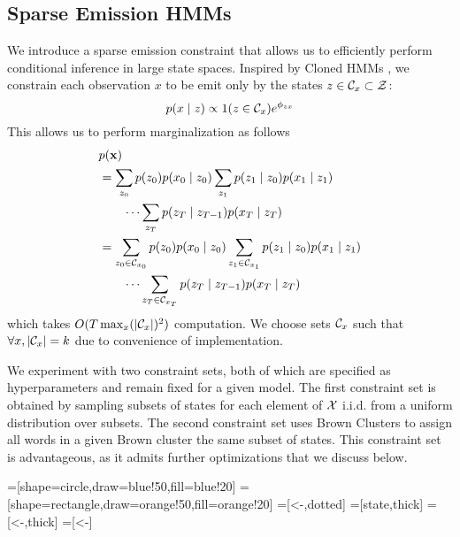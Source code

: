 \documentclass[11pt,a4paper]{article}
\begin{document}
\subsection{Sparse Emission HMMs}
We introduce a sparse emission constraint that allows us to
efficiently perform conditional inference in large state spaces.
Inspired by Cloned HMMs \citep{dedieu2019learning},
we constrain each observation $x$ to be emit only by the states $z \in \mathcal{C}_x \subset \mathcal{Z}$:
\begin{equation}
\label{eqn:sparse_emission}
p(x \mid z) \propto 1(z \in \mathcal{C}_x)e^{\phi_{zx}}
\end{equation}
This allows us to perform marginalization as follows
\begin{equation}
\label{eqn:sparse_marginalization}
\begin{aligned}
&p(\mathbf{x})\\
&= \sum_{z_0} p(z_0)p(x_0 \mid z_0)
    \sum_{z_1}p(z_1\mid z_0)p(x_1 \mid z_1)\\
    &\qquad\cdots
    \sum_{z_T}p(z_T \mid z_{T-1})p(x_T \mid z_T)\\
&= \sum_{z_0 \in \mathcal{C}_{x_0}} p(z_0)p(x_0 \mid z_0)
    \sum_{z_1 \in \mathcal{C}_{x_1}} p(z_1\mid z_0)p(x_1 \mid z_1)\\
    &\qquad\cdots
    \sum_{z_T \in \mathcal{C}_{x_T}} p(z_T \mid z_{T-1})p(x_T \mid z_T)
\end{aligned}
\end{equation}
which takes $O(T \max_x(|\mathcal{C}_x|)^2)$ computation.
We choose sets $\mathcal{C}_x$ such that $\forall x, |\mathcal{C}_x| = k$
due to convenience of implementation.

We experiment with two constraint sets, both of which are specified 
as hyperparameters and remain fixed for a given model.
The first constraint set is obtained by sampling subsets of
states for each element of $\mathcal{X}$ i.i.d. from a uniform distribution over subsets.
The second constraint set uses Brown Clusters \citep{brown1992}
to assign all words in a given Brown cluster the same subset of states.
This constraint set is advantageous, as it admits further optimizations
that we discuss below.

=[shape=circle,draw=blue!50,fill=blue!20]
=[shape=rectangle,draw=orange!50,fill=orange!20]
=[<-,dotted]
=[state,thick]
=[<-,thick]
=[<-]
\end{document}
